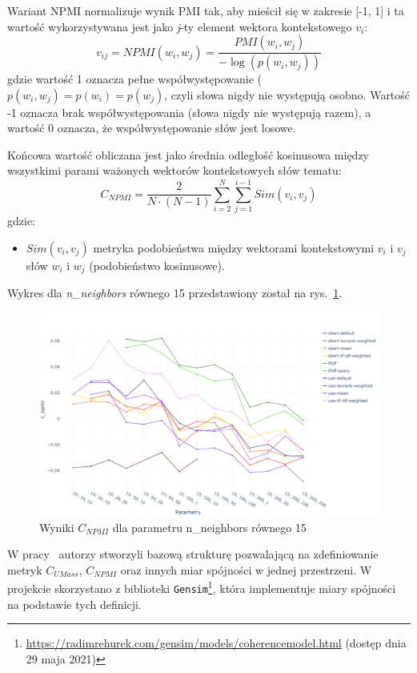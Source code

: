 	Wariant NPMI normalizuje wynik PMI tak, aby mieścił się w zakresie [-1, 1] i ta wartość wykorzystywana jest jako \emph{j}-ty element wektora kontekstowego \(v_i\):
	\[ v_{ij} = NPMI(w_i,w_j) = \frac{PMI(w_i,w_j)}{-\log(p(w_i,w_j))} \]
	gdzie wartość 1 oznacza pełne współwystępowanie (\(p(w_i,w_j)=p(w_i)=p(w_j)\), czyli słowa nigdy nie występują osobno.
	Wartość -1 oznacza brak współwystępowania (słowa nigdy nie występują razem), a wartość 0 oznacza, że współwystępowanie słów jest losowe.
	
	Końcowa wartość obliczana jest jako średnia odległość kosinusowa między wszystkimi parami ważonych wektorów kontekstowych słów tematu:
	\[ C_{NPMI} = \frac{2}{N\cdot (N-1)} \sum_{i=2}^N \sum_{j=1}^{i-1} Sim(v_i,v_j) \]
	gdzie:
	\begin{itemize}
		\item \(Sim(v_i,v_j)\) metryka podobieństwa między wektorami kontekstowymi \(v_i\) i \(v_j\) słów \(w_i\) i \(w_j\) (podobieństwo kosinusowe).
	\end{itemize}
	Wykres dla \emph{n\_neighbors} równego 15 przedstawiony został na rys.~\ref{fig:npmi_score}.

	\begin{figure}[htb]
		\centering
		\includegraphics[width=\linewidth]{rys05/c_npmi.png}
		\caption{Wyniki \(C_{NPMI}\) dla parametru n\_neighbors równego 15}\label{fig:npmi_score}
	\end{figure}

	W pracy~\cite{Eval_Topics} autorzy stworzyli bazową strukturę pozwalającą na zdefiniowanie metryk \(C_{UMass}\), \(C_{NPMI}\)
		oraz innych miar spójności w jednej przestrzeni.
	W projekcie skorzystano z biblioteki \verb|Gensim|\footnote{\url{https://radimrehurek.com/gensim/models/coherencemodel.html} (dostęp dnia 29 maja 2021)},
		która implementuje miary spójności na podstawie tych definicji.

